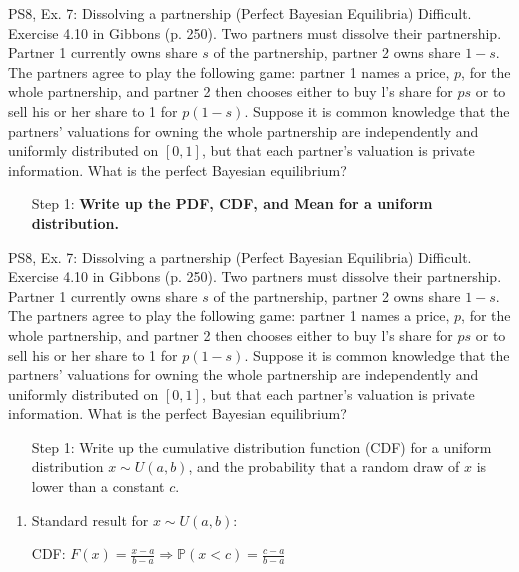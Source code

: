 \begin{frame}{PS8, Ex. 7: Dissolving a partnership (Perfect Bayesian Equilibria)}
    Difficult. Exercise 4.10 in Gibbons (p. 250). Two partners must dissolve their partnership. Partner 1 currently owns share $s$ of the partnership, partner 2 owns share $1-s$. The partners agree to play the following game: partner 1 names a price, $p$, for the whole partnership, and partner 2 then chooses either to buy l's share for $ps$ or to sell his or her share to 1 for $p(1-s)$. Suppose it is common knowledge that the partners' valuations for owning the whole partnership are independently and uniformly distributed on $[0,1]$, but that each partner's valuation is private information. What is the perfect Bayesian equilibrium?\vspace{-8pt}
    \begin{multicols}{2}
      \begin{itemize}
        \item[Step 1:] \textbf{Write up the PDF, CDF, and Mean for a uniform distribution.}
      \end{itemize}
      \vfill\null\columnbreak
      \vfill\null
    \end{multicols}
\end{frame}
\begin{frame}{PS8, Ex. 7: Dissolving a partnership (Perfect Bayesian Equilibria)}
    Difficult. Exercise 4.10 in Gibbons (p. 250). Two partners must dissolve their partnership. Partner 1 currently owns share $s$ of the partnership, partner 2 owns share $1-s$. The partners agree to play the following game: partner 1 names a price, $p$, for the whole partnership, and partner 2 then chooses either to buy l's share for $ps$ or to sell his or her share to 1 for $p(1-s)$. Suppose it is common knowledge that the partners' valuations for owning the whole partnership are independently and uniformly distributed on $[0,1]$, but that each partner's valuation is private information. What is the perfect Bayesian equilibrium?\vspace{-8pt}
    \begin{multicols}{2}
      \begin{itemize}
        \item[Step 1:] Write up the cumulative distribution function (CDF) for a uniform distribution $x\sim U(a, b)$, and the probability that a random draw of $x$ is lower than a constant $c$.
      \end{itemize}
      \vfill\null\columnbreak
      \begin{enumerate}
        \item Standard result for $x\sim U(a, b):$
        \item[CDF:] $F(x)=\frac{x-a}{b-a}\Rightarrow\mathbb{P}(x<c)=\frac{c-a}{b-a}$
      \end{enumerate}
      \vfill\null
    \end{multicols}
\end{frame}
